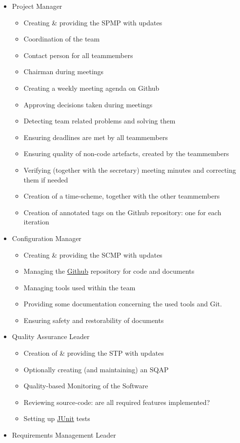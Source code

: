 \documentclass[9pt]{article}
\begin{document}
\begin{itemize}
\itemsep1pt\parskip0pt
\item
  Project Manager

  \begin{itemize}
  \itemsep1pt\parskip0pt
  \item
    Creating \& providing the SPMP with updates
  \item
    Coordination of the team
  \item
    Contact person for all teammembers
  \item
    Chairman during meetings
  \item
    Creating a weekly meeting agenda on Github
  \item
    Approving decisions taken during meetings
  \item
    Detecting team related problems and solving them
  \item
    Ensuring deadlines are met by all teammembers
  \item
    Ensuring quality of non-code artefacts, created by the teammembers
  \item
    Verifying (together with the secretary) meeting minutes and
    correcting them if needed
  \item
    Creation of a time-scheme, together with the other teammembers
  \item
    Creation of annotated tags on the Github repository: one for each
    iteration
  \end{itemize}
\item
  Configuration Manager

  \begin{itemize}
  \itemsep1pt\parskip0pt
  \item
    Creating \& providing the SCMP with updates
  \item
    Managing the \hyperref[Github]{Github} repository for code and
    documents
  \item
    Managing tools used within the team
  \item
    Providing some documentation concerning the used tools and Git.
  \item
    Ensuring safety and restorability of documents
  \end{itemize}
\item
  Quality Assurance Leader

  \begin{itemize}
  \itemsep1pt\parskip0pt
  \item
    Creation of \& providing the STP with updates
  \item
    Optionally creating (and maintaining) an SQAP
  \item
    Quality-based Monitoring of the Software
  \item
    Reviewing source-code: are all required features implemented?
  \item
    Setting up \hyperref[JUnit]{JUnit} tests
  \end{itemize}
\item
  Requirements Management Leader


\end{itemize}
\end{document}
